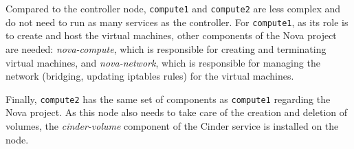 Compared to the controller node, \texttt{compute1} and \texttt{compute2} are less complex and do not need to run as many services as the controller.
For \texttt{compute1}, as its role is to create and host the virtual machines, other components of the Nova project are needed: \textit{nova-compute}, which is responsible for creating and terminating virtual machines, and \textit{nova-network}, which is responsible for managing the network (bridging, updating iptables rules) for the virtual machines.

Finally, \texttt{compute2} has the same set of components as \texttt{compute1} regarding the Nova project. 
As this node also needs to take care of the creation and deletion of volumes, the \textit{cinder-volume} component of the Cinder service is installed on the node. 


